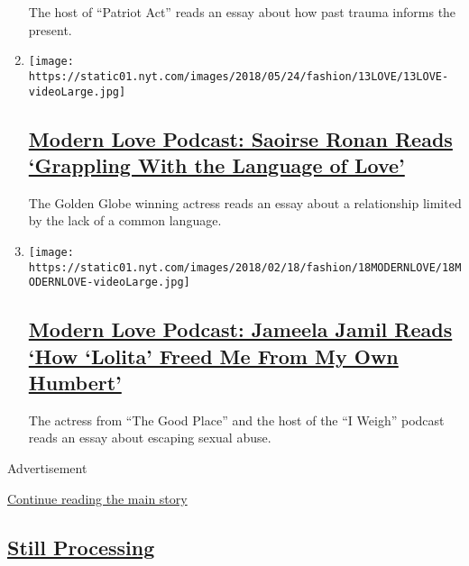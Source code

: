 \begin{enumerate}
  The host of ``Patriot Act'' reads an essay about how past trauma
  informs the present.
\item
  \texttt{[image: https://static01.nyt.com/images/2018/05/24/fashion/13LOVE/13LOVE-videoLarge.jpg]}

  \hypertarget{modern-love-podcast-saoirse-ronan-reads-grappling-with-the-language-of-love}{%
  \subsection{\texorpdfstring{\href{/2020/05/27/style/modern-love-podcast-saoirse-ronan.html}{Modern
  Love Podcast: Saoirse Ronan Reads `Grappling With the Language of
  Love'}}{Modern Love Podcast: Saoirse Ronan Reads `Grappling With the Language of Love'}}\label{modern-love-podcast-saoirse-ronan-reads-grappling-with-the-language-of-love}}

  The Golden Globe winning actress reads an essay about a relationship
  limited by the lack of a common language.
\item
  \texttt{[image: https://static01.nyt.com/images/2018/02/18/fashion/18MODERNLOVE/18MODERNLOVE-videoLarge.jpg]}

  \hypertarget{modern-love-podcast-jameela-jamil-reads-how-lolita-freed-me-from-my-own-humbert}{%
  \subsection{\texorpdfstring{\href{/2020/05/20/style/modern-love-podcast-jameela-jamil.html}{Modern
  Love Podcast: Jameela Jamil Reads `How `Lolita' Freed Me From My Own
  Humbert'}}{Modern Love Podcast: Jameela Jamil Reads `How `Lolita' Freed Me From My Own Humbert'}}\label{modern-love-podcast-jameela-jamil-reads-how-lolita-freed-me-from-my-own-humbert}}

  The actress from ``The Good Place'' and the host of the ``I Weigh''
  podcast reads an essay about escaping sexual abuse.
\end{enumerate}

Advertisement

\protect\hyperlink{after-mid2}{Continue reading the main story}

\hypertarget{still-processing}{%
\subsection{\texorpdfstring{\href{/column/still-processing-podcast}{Still
Processing}}{Still Processing}}\label{still-processing}}

